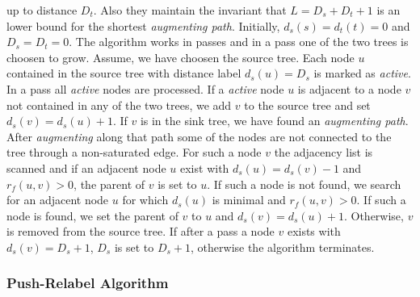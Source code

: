 up to distance $D_t$. Also they maintain the invariant that $L = D_s + D_t + 1$ is an lower bound
for the shortest \emph{augmenting path}. Initially, $d_s(s) = d_t(t) = 0$ and $D_s = D_t = 0$.
The algorithm works in passes and in a pass one of the two trees is choosen to grow. Assume, we have choosen
the source tree. Each node $u$ contained in the source tree with distance label $d_s(u) = D_s$ is
marked as \emph{active}. In a pass all \emph{active} nodes are processed. If a \emph{active} node
$u$ is adjacent to a node $v$ not contained in any of the two trees, we add $v$ to the source tree
and set $d_s(v) = d_s(u) + 1$. If $v$ is in the sink tree, we have found an \emph{augmenting path}.
After \emph{augmenting} along that path some of the nodes are not connected to the tree through a non-saturated
edge. For such a node $v$ the adjacency list is scanned and if an adjacent node $u$ exist with
$d_s(u) = d_s(v) - 1$ and $r_f(u,v) > 0$, the parent of $v$ is set to $u$. If such a node is not found,
we search for an adjacent node $u$ for which $d_s(u)$ is minimal and $r_f(u,v) > 0$. If such
a node is found, we set the parent of $v$ to $u$ and $d_s(v) = d_s(u) + 1$. Otherwise, $v$ is removed
from the source tree. If after a pass a node $v$ exists with $d_s(v) = D_s + 1$, $D_s$ is set to $D_s + 1$,
otherwise the algorithm terminates.

\subsubsection{Push-Relabel Algorithm}
\label{sec:push_relabel}

